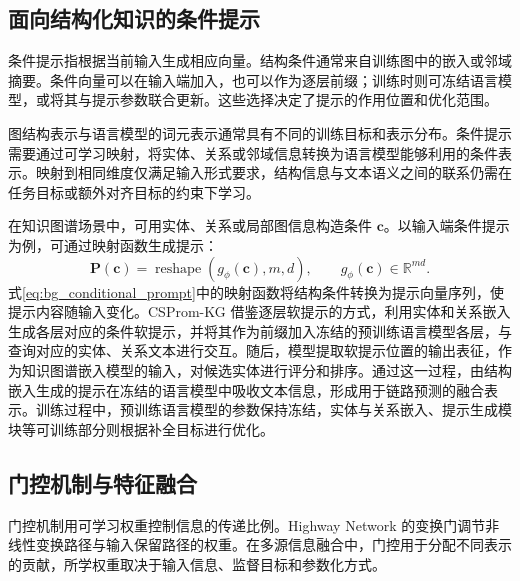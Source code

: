 \subsection{面向结构化知识的条件提示}

条件提示指根据当前输入生成相应向量。结构条件通常来自训练图中的嵌入或邻域摘要。条件向量可以在输入端加入，也可以作为逐层前缀；训练时则可冻结语言模型，或将其与提示参数联合更新。这些选择决定了提示的作用位置和优化范围。

图结构表示与语言模型的词元表示通常具有不同的训练目标和表示分布。条件提示需要通过可学习映射，将实体、关系或邻域信息转换为语言模型能够利用的条件表示。映射到相同维度仅满足输入形式要求，结构信息与文本语义之间的联系仍需在任务目标或额外对齐目标的约束下学习。

在知识图谱场景中，可用实体、关系或局部图信息构造条件 $\mathbf{c}$。以输入端条件提示为例，可通过映射函数生成提示：
\begin{equation}
    \mathbf{P}(\mathbf{c})
    =\operatorname{reshape}(g_{\phi}(\mathbf{c}),m,d),
    \qquad g_{\phi}(\mathbf{c})\in\mathbb{R}^{md}.
    \label{eq:bg_conditional_prompt}
\end{equation}
式\eqref{eq:bg_conditional_prompt}中的映射函数将结构条件转换为提示向量序列，使提示内容随输入变化。CSProm-KG 借鉴逐层软提示的方式，利用实体和关系嵌入生成各层对应的条件软提示，并将其作为前缀加入冻结的预训练语言模型各层，与查询对应的实体、关系文本进行交互。随后，模型提取软提示位置的输出表征，作为知识图谱嵌入模型的输入，对候选实体进行评分和排序。通过这一过程，由结构嵌入生成的提示在冻结的语言模型中吸收文本信息，形成用于链路预测的融合表示。训练过程中，预训练语言模型的参数保持冻结，实体与关系嵌入、提示生成模块等可训练部分则根据补全目标进行优化\cite{chen2023cspromkg}。

\subsection{门控机制与特征融合}

门控机制用可学习权重控制信息的传递比例。Highway Network 的变换门调节非线性变换路径与输入保留路径的权重\cite{srivastava2015highway}。在多源信息融合中，门控用于分配不同表示的贡献\cite{arevalo2017gated}，所学权重取决于输入信息、监督目标和参数化方式。

